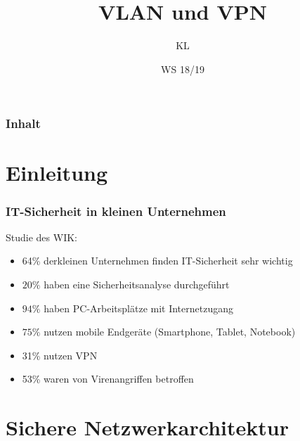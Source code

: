 \documentclass[hyperref={pdfpagelabels=false},xcolor=dvipsnames]{beamer}
\title{VLAN und VPN}
\author{KL}
\institute{Fernuniversität Hagen}
\date{WS 18/19}
\newcommand*\mi{ \item[\color{gray}\scalebox{1.2}{\textbullet}]}
\begin{document}
\begin{frame}
	\titlepage
\end{frame}
\begin{frame}
	\frametitle{Inhalt}
	\tableofcontents	
\end{frame}
\section{Einleitung}
\begin{frame}
	\frametitle{IT-Sicherheit in kleinen Unternehmen} Studie des WIK: 	
	\begin{itemize}
		\mi 64\% derkleinen Unternehmen finden IT-Sicherheit sehr wichtig
		\mi $20\%$ haben eine Sicherheitsanalyse durchgeführt
		\mi $94\%$ haben PC-Arbeitsplätze mit Internetzugang
		\mi $75\%$ nutzen mobile Endgeräte (Smartphone, Tablet, Notebook)
		\mi 31\% nutzen VPN
		\mi 53\%	waren von Virenangriffen betroffen
	\end{itemize}
	
\end{frame}
\section{Sichere Netzwerkarchitektur}
\end{document}
